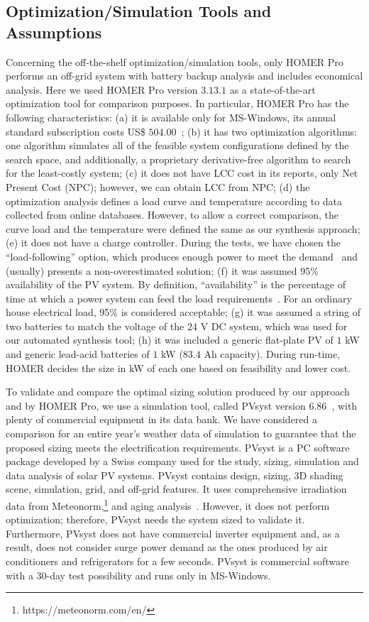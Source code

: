 \documentclass[runningheads]{llncs}
\begin{document}
\subsection{Optimization/Simulation Tools and Assumptions}
Concerning the off-the-shelf optimization/simulation tools, only HOMER Pro performs an off-grid system with battery backup analysis and includes economical analysis. Here we used HOMER Pro version $3.13.1$ as a state-of-the-art optimization tool for comparison purposes. In particular, HOMER Pro has the following characteristics:
(a) it is available only for MS-Windows, its annual standard subscription costs US\$ $504.00$~\cite{HOMER}; 
(b) it has two optimization algorithms: one algorithm simulates all of the feasible system configurations defined by the search space, and additionally, a proprietary derivative-free algorithm to search for the least-costly system;
(c) it does not have LCC cost in its reports, only Net Present Cost (NPC); however, we can obtain LCC from NPC; 
(d) the optimization analysis defines a load curve and temperature according to data collected from online databases. However, to allow a correct comparison, the curve load and the temperature were defined the same as our synthesis approach; 
(e) it does not have a charge controller. During the tests, we have chosen the ``load-following'' option, which produces enough power to meet the demand~\cite{HOMER} and (usually) presents a non-overestimated solution; 
(f) it was assumed 95\% availability of the PV system. By definition, ``availability'' is the percentage of time at which a power system can feed the load requirements~\cite{Khatib2014}. For an ordinary house electrical load, 95\% is considered acceptable;
(g) it was assumed a string of two batteries to match the voltage of the $24$ V DC system, which was used for our automated synthesis tool; 
(h) it was included a generic flat-plate PV of $1$ kW and generic lead-acid batteries of $1$ kW ($83.4$ Ah capacity). During run-time, HOMER decides the size in kW of each one based on feasibility and lower cost.

To validate and compare the optimal sizing solution produced by our approach and by HOMER Pro, we use a simulation tool, called PVsyst version $6.86$~\cite{PVsyst}, with plenty of commercial equipment in its data bank. We have considered a comparison for an entire year's weather data of simulation to guarantee that the proposed sizing meets the electrification requirements. PVsyst is a PC software package developed by a Swiss company used for the study, sizing, simulation and data analysis of solar PV systems. PVsyst contains design, sizing, 3D shading scene, simulation, grid, and off-grid features. It uses comprehensive irradiation data from Meteonorm,\footnote{https://meteonorm.com/en/} and aging analysis~\cite{PVsyst2017}. However, it does not perform optimization; therefore, PVsyst needs the system sized to validate it. Furthermore, PVsyst does not have commercial inverter equipment and, as a result, does not consider surge power demand as the ones produced by air conditioners and refrigerators for a few seconds. PVsyst is commercial software with a $30$-day test possibility and runs only in MS-Windows.
\end{document}
